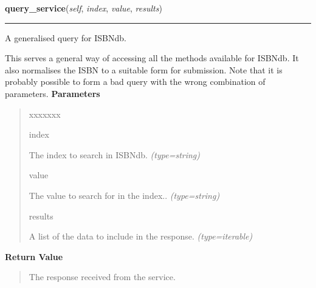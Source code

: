 \hspace{.8\funcindent}\begin{boxedminipage}{\funcwidth}

    \raggedright \textbf{query\_service}(\textit{self}, \textit{index}, \textit{value}, \textit{results})

    \vspace{-1.5ex}

    \rule{\textwidth}{0.5\fboxrule}
\setlength{\parskip}{2ex}

A generalised query for ISBNdb.

This serves a general way of accessing all the methods available for
ISBNdb. It also normalises the ISBN to a suitable form for submission.
Note that it is probably possible to form a bad query with the wrong
combination of parameters.
\setlength{\parskip}{1ex}
      \textbf{Parameters}
      \vspace{-1ex}

      \begin{quote}
        \begin{Ventry}{xxxxxxx}

          \item[index]


The index to search in ISBNdb.
            {\it (type=string)}

          \item[value]


The value to search for in the index..
            {\it (type=string)}

          \item[results]


A list of the data to include in the response.
            {\it (type=iterable)}

        \end{Ventry}

      \end{quote}

      \textbf{Return Value}
    \vspace{-1ex}

      \begin{quote}

The response received from the service.
      \end{quote}

    \end{boxedminipage}

    \label{biblio:webquery:isbndb:IsbndbQuery:query_bibdata_by_isbn}

